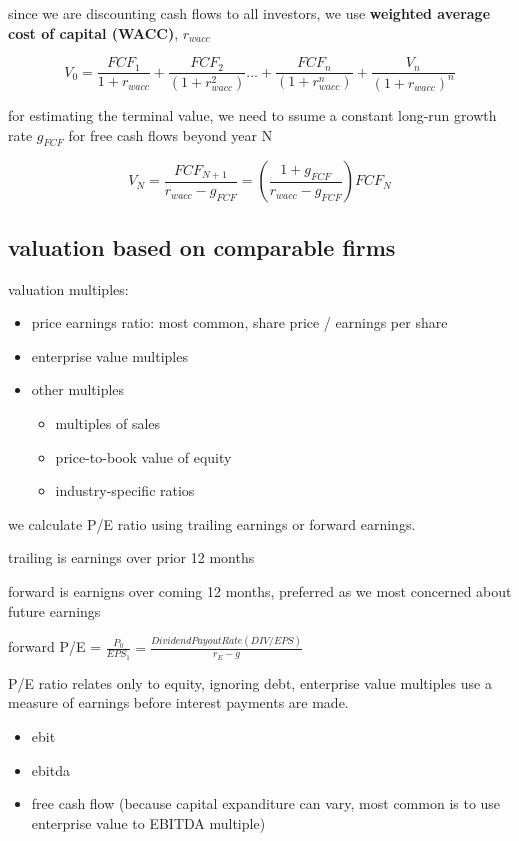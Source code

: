 \documentclass[10pt]{article}
\theoremstyle{break}
\begin{document}
since we are discounting cash flows to all investors, we use \textbf{weighted average cost of capital (WACC)}, $r_{wacc}$

$$V_0=\frac{FCF_1}{1+r_{wacc}}+\frac{FCF_2}{(1+r_{wacc}^2)}...+\frac{FCF_n}{(1+r_{wacc}^n)}+\frac{V_n}{(1+r_{wacc})^n}$$

for estimating the terminal value, we need to ssume a constant long-run growth rate $g_{FCF}$ for free cash flows beyond year N

$$V_N = \frac{FCF_{N+1}}{r_{wacc}-g_{FCF}}= (\frac{1+g_{FCF}}{r_{wacc}-g_{FCF} })FCF_N$$

\subsection{valuation based on comparable firms}
valuation multiples: 
\begin{itemize}
    \item price earnings ratio: most common, share price / earnings per share
    \item enterprise value multiples 
    \item other multiples \begin{itemize}
        \item multiples of sales 
        \item price-to-book value of equity 
        \item industry-specific ratios
    \end{itemize}
\end{itemize}

we calculate P/E ratio using trailing earnings or forward earnings. 

trailing is earnings over prior 12 months 

forward is earnigns over coming 12 months, preferred as we most concerned about future earnings 

forward P/E = $\frac{P_0}{EPS_1}=\frac{DividendPayoutRate(DIV/EPS)}{r_E-g}$

P/E ratio relates only to equity, ignoring debt, enterprise value multiples use a measure of earnings before interest payments are made.
\begin{itemize}
    \item ebit 
    \item ebitda 
    \item free cash flow (because capital expanditure can vary, most common is to use enterprise value to EBITDA multiple)
\end{itemize}
\end{document}
